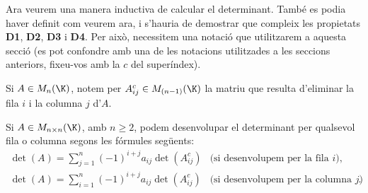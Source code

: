  Ara veurem una manera inductiva de calcular el determinant. També es podia haver definit com veurem ara, i s'hauria de demostrar que compleix les propietats \textbf{D1}, \textbf{D2}, \textbf{D3} i \textbf{D4}. Per això, necessitem una notació que utilitzarem a aquesta secció (es pot confondre amb una de les notacions utilitzades a les seccions anteriors, fixeu-vos amb la $c$ del superíndex).
\begin{notacio}
	Si $A\in M_{n}(\K)$, notem per $A^c_{ij}\in M_{(n-1)}(\K)$ la matriu que resulta d'eliminar la fila $i$ i la columna $j$ d'$A$. 
\end{notacio}
\begin{proposicio}\label{prop:defdet}
	Si $A\in M_{n\times n}(\K)$, amb $n\geq2$, podem desenvolupar el determinant per qualsevol fila o columna segons les fórmules següents:
	$$
	\begin{array}{ll}
	\det(A)=\sum_{j=1}^n (-1)^{i+j} a_{ij} \det(A^c_{ij}) & \text{(si desenvolupem per la fila $i$)},\\[3mm]
	\det(A)=\sum_{i=1}^n (-1)^{i+j} a_{ij} \det(A^c_{ij}) & \text{(si desenvolupem per la columna $j$)}.
	\end{array}
	$$
\end{proposicio}

